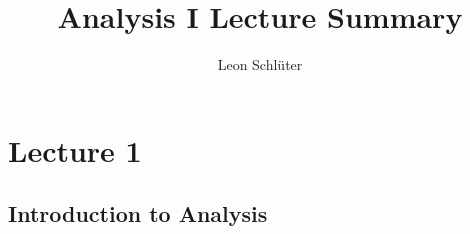 \documentclass[a4paper,10pt]{article}
\title{Analysis I Lecture Summary}
\author{Leon Schlüter}
\begin{document}
\maketitle
    \section{Lecture 1}
    \subsection{Introduction to Analysis}
\end{document}
